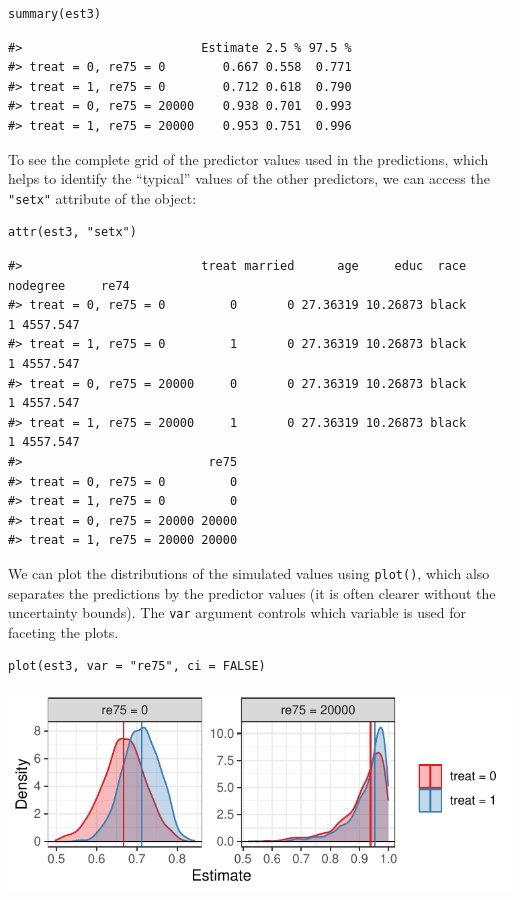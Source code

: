 \begin{verbatim}
summary(est3)
\end{verbatim}

\begin{verbatim}
#>                         Estimate 2.5 % 97.5 %
#> treat = 0, re75 = 0        0.667 0.558  0.771
#> treat = 1, re75 = 0        0.712 0.618  0.790
#> treat = 0, re75 = 20000    0.938 0.701  0.993
#> treat = 1, re75 = 20000    0.953 0.751  0.996
\end{verbatim}

To see the complete grid of the predictor values used in the predictions, which helps to identify the ``typical'' values of the other predictors, we can access the \texttt{"setx"} attribute of the object:

\begin{verbatim}
attr(est3, "setx")
\end{verbatim}

\begin{verbatim}
#>                         treat married      age     educ  race nodegree     re74
#> treat = 0, re75 = 0         0       0 27.36319 10.26873 black        1 4557.547
#> treat = 1, re75 = 0         1       0 27.36319 10.26873 black        1 4557.547
#> treat = 0, re75 = 20000     0       0 27.36319 10.26873 black        1 4557.547
#> treat = 1, re75 = 20000     1       0 27.36319 10.26873 black        1 4557.547
#>                          re75
#> treat = 0, re75 = 0         0
#> treat = 1, re75 = 0         0
#> treat = 0, re75 = 20000 20000
#> treat = 1, re75 = 20000 20000
\end{verbatim}

We can plot the distributions of the simulated values using \texttt{plot()}, which also separates the predictions by the predictor values (it is often clearer without the uncertainty bounds). The \texttt{var} argument controls which variable is used for faceting the plots.

\begin{verbatim}
plot(est3, var = "re75", ci = FALSE)
\end{verbatim}

\begin{center}\includegraphics{figures/unnamed-chunk-14-1} \end{center}


